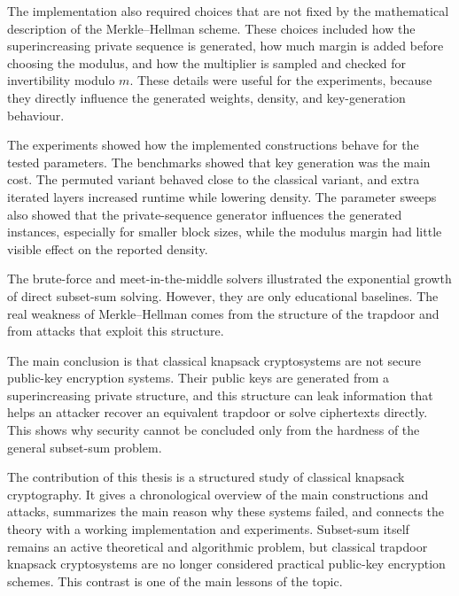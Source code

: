The implementation also required choices that are not fixed by the mathematical
description of the Merkle--Hellman scheme. These choices included how the
superincreasing private sequence is generated, how much margin is added before
choosing the modulus, and how the multiplier is sampled and checked for
invertibility modulo \(m\). These details were useful for the experiments,
because they directly influence the generated weights, density, and
key-generation behaviour.

The experiments showed how the implemented constructions behave for the tested
parameters. The benchmarks showed that key generation was the main cost. The permuted
variant behaved close to the classical variant, and extra iterated layers
increased runtime while lowering density. The parameter sweeps also showed that
the private-sequence generator influences the generated instances, especially
for smaller block sizes, while the modulus margin had little visible effect on
the reported density.

The brute-force and meet-in-the-middle solvers illustrated the
exponential growth of direct subset-sum solving. However, they are only
educational baselines. The real weakness of Merkle--Hellman comes from the
structure of the trapdoor and from attacks that exploit this structure.

The main conclusion is that classical knapsack cryptosystems are not secure
public-key encryption systems. Their public keys are generated from a
superincreasing private structure, and this structure can leak information that
helps an attacker recover an equivalent trapdoor or solve ciphertexts directly.
This shows why security cannot be concluded only from the hardness of the
general subset-sum problem.

The contribution of this thesis is a structured study of classical knapsack
cryptography. It gives a chronological overview of the main constructions and
attacks, summarizes the main reason why these systems failed, and connects the
theory with a working implementation and experiments. Subset-sum itself remains
an active theoretical and algorithmic problem, but classical trapdoor knapsack
cryptosystems are no longer considered practical public-key encryption schemes.
This contrast is one of the main lessons of the topic.
